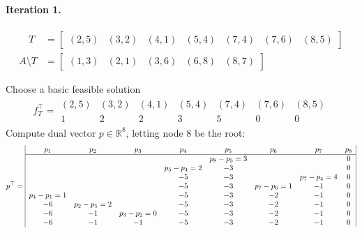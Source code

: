\documentclass[11pt]{exam}
\begin{document}
\begin{questions}
\begin{parts}
        \paragraph{Iteration 1.}
        \begin{align*}
            \quad T &= \begin{bmatrix}
                (2,5) & (3,2) & (4,1) & (5,4) & (7,4) & (7,6) & (8,5)
            \end{bmatrix}\\
            A\setminus T &= \begin{bmatrix}
                (1,3) & (2,1) & (3,6) & (6,8) & (8,7)
            \end{bmatrix}
        \end{align*}
        \begin{subparts}
            \subpart Choose a basic feasible solution
            \begin{align*}
                f_T^\top = \begin{array}{ccccccc}
                    (2,5) & (3,2) & (4,1) & (5,4) & (7,4) & (7,6) & (8,5)\\
                    \hline
                    1 & 2 & 2 & 3 & 5 & 0 & 0
                \end{array}
            \end{align*}
            \subpart Compute dual vector $p \in \mathbb R^{8}$, letting node $8$ be the root:
            {\small\begin{align*}
                p^\top = \begin{array}{|cccccccc|}
                    p_1& p_2& p_3& p_4& p_5& p_6& p_7& p_8\\\hline
                    &&&&p_8 - p_5 = 3&&&0\\
                    &&&p_5 - p_4 = 2&-3 &&&0\\
                    &&&-5& -3 &&p_7 - p_4 = 4&0\\
                    &&&-5& -3 &p_7 - p_6 = 1&-1&0\\
                    p_4 - p_1 = 1&&&-5& -3 &-2&-1&0\\
                    -6&p_2 - p_5 = 2&&-5& -3 &-2&-1&0\\
                    -6&-1&p_3 - p_2 = 0&-5& -3 &-2&-1&0\\
                    -6&-1&-1&-5& -3 &-2&-1&0\\
                \end{array}
            \end{align*}}


\end{subparts}
\end{parts}
\end{questions}
\end{document}
